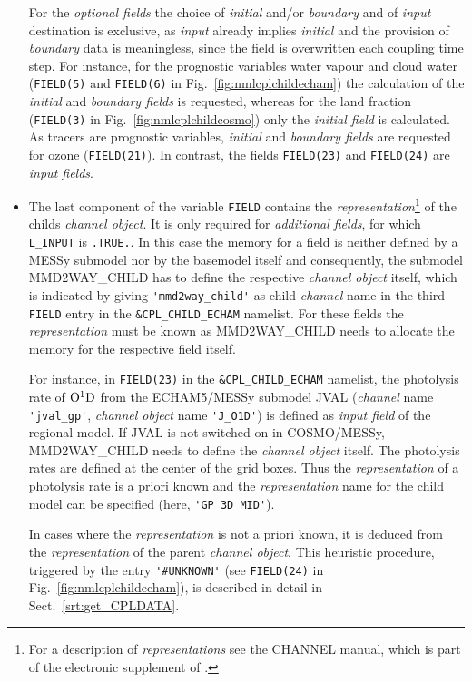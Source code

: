 \documentclass[11pt,twoside]{article}
\begin{document}
\begin{itemize}
 For the {\it optional fields} the choice of {\it initial} and/or {\it boundary}
 and of {\it input} destination is exclusive, as {\it input} already 
implies {\it initial} and the provision of {\it boundary} data  is meaningless, 
since the field is overwritten each coupling time step.
For instance, for the prognostic variables water vapour and cloud water 
(\verb|FIELD(5)| and \verb|FIELD(6)| in Fig.\ \ref{fig:nmlcplchildecham}) the 
 calculation of the {\it initial} and  {\it boundary fields} is requested,
 whereas for the land fraction (\verb|FIELD(3)| in  Fig.\ \ref{fig:nmlcplchildcosmo})
 only the {\it initial field}  is calculated. As tracers are prognostic 
variables, {\it initial} and {\it boundary fields} are requested for ozone 
(\verb|FIELD(21)|). In contrast, the fields \verb|FIELD(23)| and
 \verb|FIELD(24)| are {\it input fields}.

\item The last component of the variable \verb|FIELD| contains the
 {\it representation}\footnote{For a description of {\it representations} see
 the 
 CHANNEL manual, which is part of the electronic supplement of 
\cite{Joeckel10a}.} of the childs {\it channel object}. It is only 
required for {\it additional fields}, for which \verb|L_INPUT|
is \verb|.TRUE.|.  
In this case the memory for a field is neither defined by a MESSy submodel nor 
by the basemodel itself and consequently, the submodel MMD2WAY\_CHILD has to
define the respective  
{\it channel object} itself, which is indicated by
giving \verb|'mmd2way_child'| as  child {\it channel} name in the
third \verb|FIELD| entry in the \verb|&CPL_CHILD_ECHAM| 
namelist. For these fields the {\it representation} must be known as
MMD2WAY\_CHILD  needs to allocate the memory for the respective field itself.
 
For instance, in \verb|FIELD(23)| in the \verb|&CPL_CHILD_ECHAM| namelist, the 
photolysis rate of $\rm O^1D$ from the ECHAM5/MESSy submodel JVAL ({\it channel}
 name \verb|'jval_gp'|, {\it channel object} name \verb|'J_O1D'|) is defined
 as {\it input field} of the regional model. If JVAL is not switched on in 
COSMO/MESSy, MMD2WAY\_CHILD needs to define the {\it channel object} itself. 
The photolysis rates are defined at the center of the grid boxes.
Thus the {\it representation} of a photolysis rate is a priori known and the 
{\it representation} name for the child model can be specified (here,
\verb|'GP_3D_MID'|).

In cases where the {\it representation} is not a priori known, it is deduced
from the {\it representation} of the parent {\it channel object}. This heuristic
procedure, triggered by the entry \verb|'#UNKNOWN'| (see \verb|FIELD(24)| in
 Fig.\ \ref{fig:nmlcplchildecham}), 
is described in detail in Sect.~\ref{srt:get_CPLDATA}.
\end{itemize}
\end{document}
